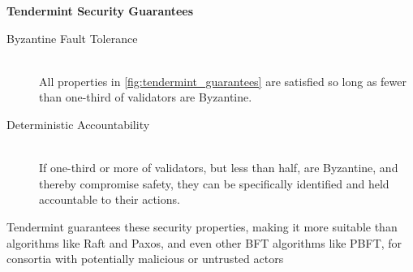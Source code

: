 
\textbf{Tendermint Security Guarantees}
\begin{description}
  \item[Byzantine Fault Tolerance] \hfill \\
	All properties in \ref{fig:tendermint_guarantees} are satisfied so long as fewer than one-third of validators are Byzantine.
  \item[Deterministic Accountability] \hfill \\
	If one-third or more of validators, but less than half, are Byzantine, and thereby compromise safety, 
	they can be specifically identified and held accountable to their actions.
\end{description}
\caption[Tendermint Security Guarantees]{Tendermint guarantees these security properties, making it more suitable than algorithms like Raft and Paxos, and even other BFT algorithms like PBFT, for consortia with potentially malicious or untrusted actors}
